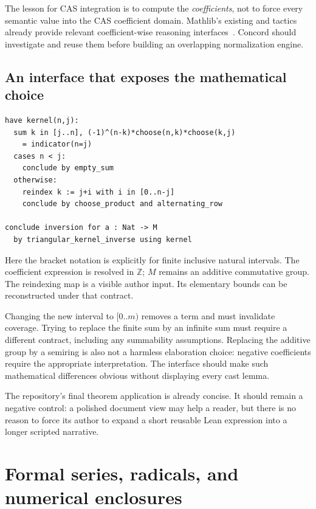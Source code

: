 \documentclass[11pt,a4paper]{article}
\newcommand{\code}[1]{\texttt{\detokenize{#1}}}
\newcommand{\Z}{\mathbb Z}
\theoremstyle{remark}
\begin{document}
The lesson for CAS integration is to compute the \emph{coefficients}, not to
force every semantic value into the CAS coefficient domain. Mathlib's existing
\code{match_scalars} and \code{module} tactics already provide relevant
coefficient-wise reasoning interfaces~\cite{module}. Concord should investigate
and reuse them before building an overlapping normalization engine.

\subsection{An interface that exposes the mathematical choice}
\par\smallskip\noindent\begin{minipage}{\linewidth}
\begin{lstlisting}
have kernel(n,j):
  sum k in [j..n], (-1)^(n-k)*choose(n,k)*choose(k,j)
    = indicator(n=j)
  cases n < j:
    conclude by empty_sum
  otherwise:
    reindex k := j+i with i in [0..n-j]
    conclude by choose_product and alternating_row

conclude inversion for a : Nat -> M
  by triangular_kernel_inverse using kernel
\end{lstlisting}
\end{minipage}\par\smallskip
Here the bracket notation is explicitly for finite inclusive natural intervals.
The coefficient expression is resolved in $\Z$; $M$ remains an additive
commutative group. The reindexing map is a visible author input. Its elementary
bounds can be reconstructed under that contract.

Changing the new interval to $[0..m)$ removes a term and must invalidate coverage.
Trying to replace the finite sum by an infinite sum must require a different
contract, including any summability assumptions. Replacing the additive group by
a semiring is also not a harmless elaboration choice: negative coefficients
require the appropriate interpretation. The interface should make such
mathematical differences obvious without displaying every cast lemma.

The repository's final theorem application is already concise. It should remain
a negative control: a polished document view may help a reader, but there is no
reason to force its author to expand a short reusable Lean expression into a
longer scripted narrative.

\section{Formal series, radicals, and numerical enclosures}
\label{sec:other}
\end{document}
